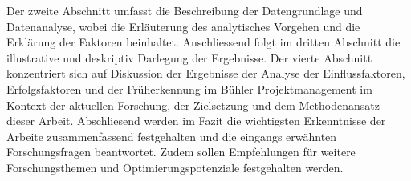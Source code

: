 \newline\newline
Der zweite Abschnitt umfasst die Beschreibung der Datengrundlage und Datenanalyse, wobei die Erläuterung des analytisches Vorgehen und die Erklärung der Faktoren beinhaltet. Anschliessend folgt im dritten Abschnitt die illustrative und deskriptiv Darlegung der Ergebnisse. Der vierte Abschnitt konzentriert sich auf Diskussion der Ergebnisse der Analyse der Einflussfaktoren, Erfolgsfaktoren und der Früherkennung im Bühler Projektmanagement im Kontext der aktuellen Forschung, der Zielsetzung und dem Methodenansatz dieser Arbeit.
\newline\newline
Abschliesend werden im Fazit die wichtigsten Erkenntnisse der Arbeite zusammenfassend festgehalten und die eingangs erwähnten Forschungsfragen beantwortet. Zudem sollen Empfehlungen für weitere Forschungsthemen und Optimierungspotenziale festgehalten werden.

	




